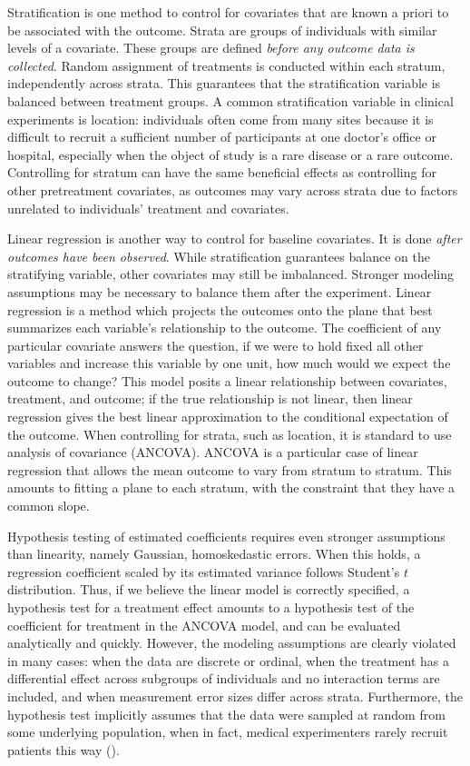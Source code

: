 \documentclass[12pt]{article}
\begin{document}
Stratification is one method to control for covariates that are known a priori to be associated with the outcome.
Strata are groups of individuals with similar levels of a covariate.
These groups are defined \textit{before any outcome data is collected}.
Random assignment of treatments is conducted within each stratum, independently across strata.
This guarantees that the stratification variable is balanced between treatment groups.
A common stratification variable in clinical experiments is location:
individuals often come from many sites because it is difficult to recruit a sufficient number of participants at one doctor's office or hospital,
especially when the object of study is a rare disease or a rare outcome.
Controlling for stratum can have the same beneficial effects as controlling for other pretreatment covariates, 
as outcomes may vary across strata due to factors unrelated to individuals' treatment and covariates.

Linear regression is another way to control for baseline covariates.
It is done \textit{after outcomes have been observed}.
While stratification guarantees balance on the stratifying variable, other covariates may still be imbalanced.
Stronger modeling assumptions may be necessary to balance them after the experiment.
Linear regression is a method which projects the outcomes onto the plane that best summarizes each variable's relationship to the outcome.
The coefficient of any particular covariate answers the question, if we were to hold fixed all other variables and increase this variable by one unit, how much would we expect the outcome to change?
This model posits a linear relationship between covariates, treatment, and outcome; 
if the true relationship is not linear, then linear regression gives the best linear approximation to the conditional expectation of the outcome.
When controlling for strata, such as location, it is standard to use analysis of covariance (ANCOVA).
ANCOVA is a particular case of linear regression that allows the mean outcome to vary from stratum to stratum.
This amounts to fitting a plane to each stratum, with the constraint that they have a common slope.

Hypothesis testing of estimated coefficients requires even stronger assumptions than linearity, namely Gaussian, homoskedastic errors.
When this holds, a regression coefficient scaled by its estimated variance follows Student's $t$ distribution.
Thus, if we believe the linear model is correctly specified, a hypothesis test for a treatment effect amounts to a hypothesis test of the coefficient for treatment in the ANCOVA model, and can be evaluated analytically and quickly.
However, the modeling assumptions are clearly violated in many cases:
when the data are discrete or ordinal, 
when the treatment has a differential effect across subgroups of individuals and no interaction terms are included, 
and when measurement error sizes differ across strata.
Furthermore, the hypothesis test implicitly assumes that the data were sampled at random from some underlying population, when in fact,
medical experimenters rarely recruit patients this way (\cite{ludbrook_why_1998}).
\end{document}
